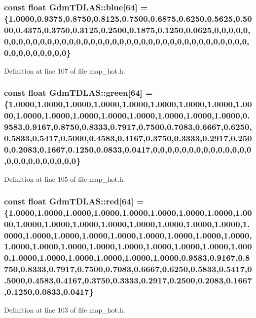 \subsubsection[{blue}]{\setlength{\rightskip}{0pt plus 5cm}const float {\bf GdmTDLAS::blue}[64] = \{1.0000,0.9375,0.8750,0.8125,0.7500,0.6875,0.6250,0.5625,0.5000,0.4375,0.3750,0.3125,0.2500,0.1875,0.1250,0.0625,0,0,0,0,0,0,0,0,0,0,0,0,0,0,0,0,0,0,0,0,0,0,0,0,0,0,0,0,0,0,0,0,0,0,0,0,0,0,0,0,0,0,0,0,0,0,0,0\}\hspace{0.3cm}{\ttfamily  [static]}}\label{namespaceGdmTDLAS_a074e9fbd2d782471c67a4d46c226eff9}


Definition at line 107 of file map\_\-hot.h.

\subsubsection[{green}]{\setlength{\rightskip}{0pt plus 5cm}const float {\bf GdmTDLAS::green}[64] = \{1.0000,1.0000,1.0000,1.0000,1.0000,1.0000,1.0000,1.0000,1.0000,1.0000,1.0000,1.0000,1.0000,1.0000,1.0000,1.0000,1.0000,0.9583,0.9167,0.8750,0.8333,0.7917,0.7500,0.7083,0.6667,0.6250,0.5833,0.5417,0.5000,0.4583,0.4167,0.3750,0.3333,0.2917,0.2500,0.2083,0.1667,0.1250,0.0833,0.0417,0,0,0,0,0,0,0,0,0,0,0,0,0,0,0,0,0,0,0,0,0,0,0,0\}\hspace{0.3cm}{\ttfamily  [static]}}\label{namespaceGdmTDLAS_a93696941815791ec15704a73259aa174}


Definition at line 105 of file map\_\-hot.h.

\subsubsection[{red}]{\setlength{\rightskip}{0pt plus 5cm}const float {\bf GdmTDLAS::red}[64] = \{1.0000,1.0000,1.0000,1.0000,1.0000,1.0000,1.0000,1.0000,1.0000,1.0000,1.0000,1.0000,1.0000,1.0000,1.0000,1.0000,1.0000,1.0000,1.0000,1.0000,1.0000,1.0000,1.0000,1.0000,1.0000,1.0000,1.0000,1.0000,1.0000,1.0000,1.0000,1.0000,1.0000,1.0000,1.0000,1.0000,1.0000,1.0000,1.0000,1.0000,1.0000,0.9583,0.9167,0.8750,0.8333,0.7917,0.7500,0.7083,0.6667,0.6250,0.5833,0.5417,0.5000,0.4583,0.4167,0.3750,0.3333,0.2917,0.2500,0.2083,0.1667,0.1250,0.0833,0.0417\}\hspace{0.3cm}{\ttfamily  [static]}}\label{namespaceGdmTDLAS_a13f269995af3f50d6a01816dee988a93}


Definition at line 103 of file map\_\-hot.h.

